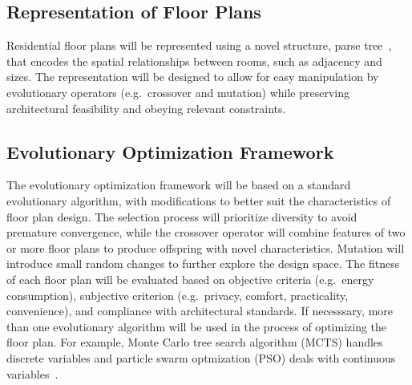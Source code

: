 \documentclass[]{article}
\begin{document}
\subsection{Representation of Floor Plans}
Residential floor plans will be represented using a novel structure, parse tree~\cite{khade2023}, that encodes the spatial relationships between rooms, such as adjacency and sizes. The representation will be designed to allow for easy manipulation by evolutionary operators (e.g.~crossover and mutation) while preserving architectural feasibility and obeying relevant constraints.

\subsection{Evolutionary Optimization Framework}
The evolutionary optimization framework will be based on a standard evolutionary algorithm, with modifications to better suit the characteristics of floor plan design. The selection process will prioritize diversity to avoid premature convergence, while the crossover operator will combine features of two or more floor plans to produce offspring with novel characteristics. Mutation will introduce small random changes to further explore the design space. The fitness of each floor plan will be evaluated based on objective criteria (e.g.\ energy consumption), subjective criterion (e.g.\ privacy, comfort, practicality, convenience), and compliance with architectural standards. If necesssary, more than one evolutionary algorithm will be used in the process of optimizing the floor plan. For example, Monte Carlo tree search algorithm (MCTS) handles discrete variables and particle swarm optmization (PSO) deals with continuous variables~\cite{YAN2024110546}.
\end{document}

